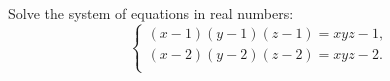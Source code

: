 Solve the system of equations in real numbers:\[

\begin{cases*}

(x - 1)(y - 1)(z - 1) = xyz - 1,\\

(x - 2)(y - 2)(z - 2) = xyz - 2.\\

\end{cases*}

\]
